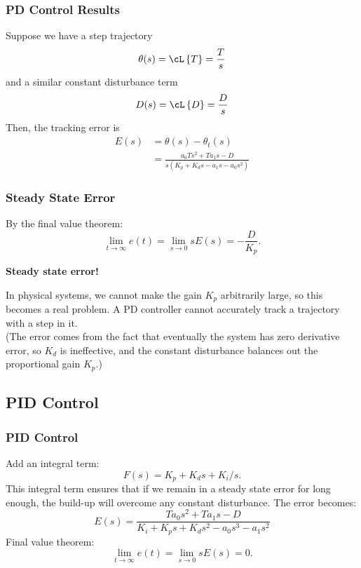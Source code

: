 \documentclass{beamer}
\begin{document}
\begin{frame}
    \frametitle{PD Control Results}
    Suppose we have a step trajectory
    \[\theta(s) = \cL\left\{ T \right\} = \frac{T}{s}\]
    and a similar constant disturbance term
    \[D(s) = \cL\left\{ D \right\} = \frac{D}{s}\]
    Then, the tracking error is
    \begin{align*}
        E(s) &= \theta(s) - \theta_t(s) \\
        &= \frac{a_0Ts^2 + Ta_1s - D}{s(K_p + K_ds - a_1s - a_0s^2)}
    \end{align*}
\end{frame}

\begin{frame}
    \frametitle{Steady State Error}
    By the final value theorem:
    \[\lim_{t\to\infty} e(t) = \lim_{s\to 0} sE(s) = -\frac{D}{K_p}.\]
    \centerline{\textbf{Steady state error!}}
    In physical systems, we cannot make the gain $K_p$ arbitrarily large, so
    this becomes a real problem. A PD controller cannot accurately track a trajectory with a step in
    it.\\
    (The error comes from the fact that eventually the system has zero derivative error, so $K_d$ is
    ineffective, and the constant disturbance balances out the proportional gain $K_p$.)
\end{frame}

\subsection{PID Control}
\begin{frame}
    \frametitle{PID Control}
    Add an integral term:
    \[F(s) = K_p + K_d s + K_i/s.\]
    This integral term ensures that if we remain in a steady state error for long enough, the
    build-up will overcome any constant disturbance. The error becomes:
    \[E(s) = \frac{Ta_0s^2 + Ta_1s - D}{K_i + K_ps + K_ds^2 - a_0s^3 - a_1s^2}\]
    Final value theorem:
    \[\lim_{t\to\infty} e(t) = \lim_{s\to 0} sE(s) = 0.\]
\end{frame}
\end{document}
